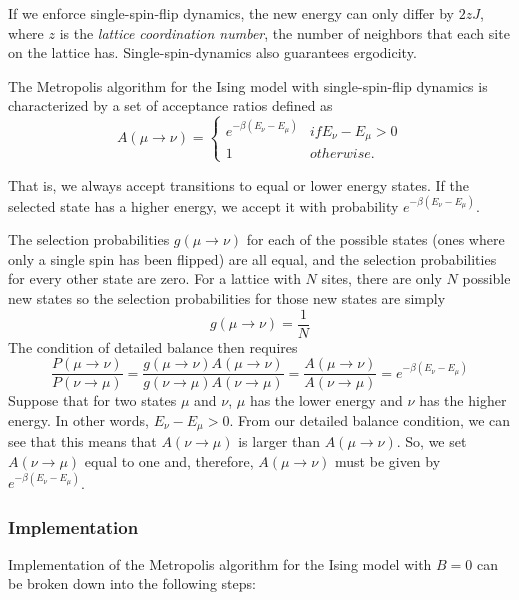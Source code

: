\documentclass{article}
\begin{document}
If we enforce single-spin-flip dynamics, the new energy can only differ by $2zJ$, where $z$ is the
\emph{lattice coordination number}, the number of neighbors that each site on the lattice has. Single-spin-dynamics
also guarantees ergodicity.

The Metropolis algorithm for the Ising model with single-spin-flip dynamics is characterized by a set of acceptance ratios
defined as
\begin{equation}
A(\mu \rightarrow \nu) = \left\{\begin{matrix}
e^{-\beta(E_{\nu} - E_{\mu})} & if E_{\nu} - E_{\mu} > 0\\
1 & otherwise.
\end{matrix}\right.
\end{equation}

That is, we always accept transitions to equal or lower energy states. If the selected state has a higher energy, we
accept it with probability $e^{-\beta(E_{\nu} - E_{\mu})}$.

The selection probabilities $g(\mu \rightarrow \nu)$ for each of the possible states (ones where only a single spin has
been flipped) are all equal, and the selection probabilities for every other state are zero. For a lattice with $N$ sites,
there are only $N$ possible new states so the selection probabilities for those new states are simply
$$
g(\mu \rightarrow \nu) = \frac{1}{N}
$$
The condition of detailed balance then requires
$$
\frac{P(\mu \rightarrow \nu)}{P(\nu \rightarrow \mu)}
= \frac{g(\mu \rightarrow \nu)A(\mu \rightarrow \nu)}{g(\nu \rightarrow \mu)A(\nu \rightarrow \mu)}
= \frac{A(\mu \rightarrow \nu)}{A(\nu \rightarrow \mu)}
= e^{-\beta(E_{\nu} - E_{\mu})}
$$
Suppose that for two states $\mu$ and $\nu$, $\mu$ has the lower energy and $\nu$ has the higher energy.
In other words, $E_{\nu} - E_{\mu} > 0$. From our detailed balance condition, we can see that this means
that $A(\nu \rightarrow \mu)$ is larger than $A(\mu \rightarrow \nu)$. So, we set $A(\nu \rightarrow \mu)$ equal
to one and, therefore, $A(\mu \rightarrow \nu)$ must be given by $e^{-\beta(E_{\nu} - E_{\mu})}$.

\subsubsection{Implementation}
Implementation of the Metropolis algorithm for the Ising model with $B = 0$ can
be broken down into the following steps:
\end{document}
